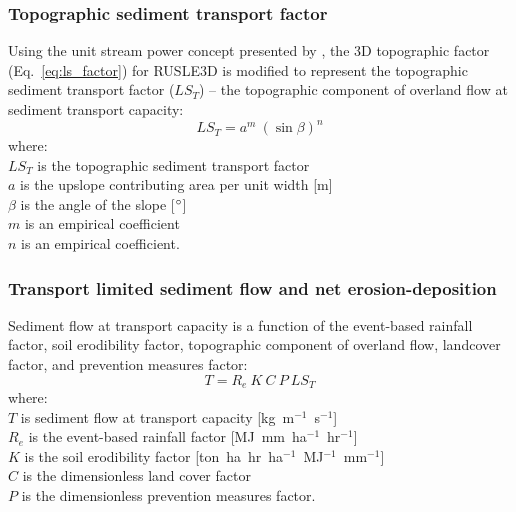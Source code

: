\documentclass[gmd, manuscript]{copernicus}
\begin{document}
\subsubsection{Topographic sediment transport factor}
Using the unit stream power concept presented by \cite{Moore1986},
the 3D topographic factor (Eq.~\ref{eq:ls_factor}) 
for RUSLE3D is modified to represent 
the topographic sediment transport factor ($LS_T$) --
the topographic component 
of overland flow at sediment transport capacity:
%
\begin{equation}
\label{eq:lst_factor}
{LS_T = a^{m} ~ (\sin \beta)^{n}}
\end{equation}
%
{\small
\noindent
where: \\
\noindent
\hspace*{0.5em} $LS_T$ is the topographic sediment transport factor\\
\hspace*{0.5em} $a$ is the upslope contributing area per unit width [\unit{m}]\\
\hspace*{0.5em} $\beta$ is the angle of the slope [$^{\circ}$]\\
\hspace*{0.5em} $m$ is an empirical coefficient\\
\hspace*{0.5em} $n$ is an empirical coefficient.\\
}

\subsubsection{Transport limited sediment flow and net erosion-deposition}
\noindent
Sediment flow at transport capacity is a function of 
the event-based rainfall factor, soil erodibility factor, 
topographic component of overland flow,
landcover factor, and prevention measures factor:
%
\begin{equation}
\label{eq:usped}
{T = R_e ~ K ~ C ~ P ~ LS_T}
\end{equation}
{\small
\noindent
where: \\
\noindent
\hspace*{0.5em} $T$ is sediment flow at transport capacity [\unit{kg~m}$^{-1}$~\unit{s}$^{-1}$]\\ 
\hspace*{0.5em} $R_e$ is the event-based rainfall factor [\unit{MJ~mm~ha}$^{-1}$~\unit{hr}$^{-1}$]\\
\hspace*{0.5em} $K$ is the soil erodibility factor [\unit{ton~ha~hr~ha}$^{-1}$~\unit{MJ}$^{-1}$~\unit{mm}$^{-1}$]\\ 
\hspace*{0.5em} $C$ is the dimensionless land cover factor\\
\hspace*{0.5em} $P$ is the dimensionless prevention measures factor.\\
}
\end{document}
